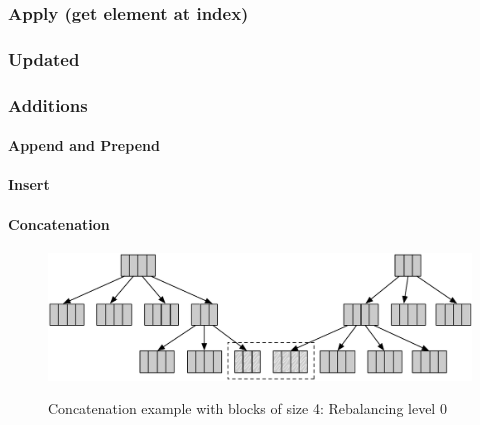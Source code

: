 
\subsubsection{Apply (get element at index)}



\subsubsection{Updated}



\subsubsection{Additions}

\paragraph{Append and Prepend}

\paragraph{Insert}


\paragraph{Concatenation}

\begin{figure}[h!]
  \centering
  \includegraphics[width=\textwidth]{Figures/Concat0.pdf}
  \label{Concat0Benchmarks}
  \caption{Concatenation example with blocks of size 4: Rebalancing level 0}
\end{figure}

